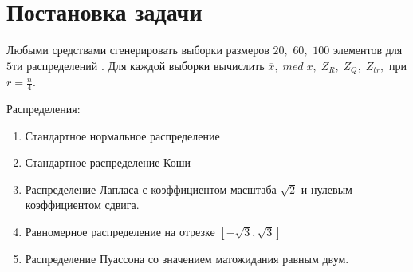 \documentclass[a4]{article}
\renewcommand{\listoffigures}{\begingroup %
\tocsection
\tocfile{\listfigurename}{lof}
\endgroup}
\begin{document}
\newpage
\pagestyle{plain}




\newpage
\tableofcontents{}
\newpage
\listoffigures
\newpage

\section{Постановка задачи}

Любыми средствами сгенерировать выборки размеров $20,$ $60,$ $100$ элементов для $5$ти распределений \cite{distr_formulas}. Для каждой выборки вычислить $\overline{x},\; med\; x,\; Z_R,\; Z_Q,\; Z_{tr},$ при $r = \frac{n}{4}.$

Распределения:
\begin{enumerate}
\item Стандартное нормальное распределение
\item Стандартное распределение Коши
\item Распределение Лапласа с коэффициентом масштаба $\sqrt{2}$ и нулевым коэффициентом сдвига.
\item Равномерное распределение на отрезке $\left[-\sqrt{3}, \sqrt{3}\right]$
\item Распределение Пуассона со значением матожидания равным двум.
\end{enumerate}

\end{document}
